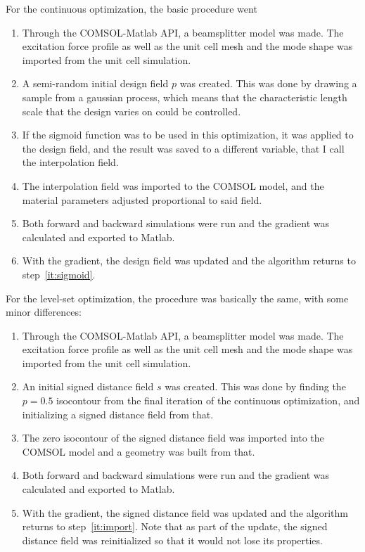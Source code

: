 For the continuous optimization, the basic procedure went
\begin{enumerate}
	\item Through the COMSOL-Matlab API, a beamsplitter model was made.
		The excitation force profile as well as the unit cell mesh and the mode
		shape was imported from the unit cell simulation.
	\item A semi-random initial design field $p$ was created. This was done by
		drawing a sample from a gaussian process, which means that the characteristic
		length scale that the design varies on could be controlled.
	\item\label{it:sigmoid} If the sigmoid function was to be used in this optimization, it was
		applied to the design field, and the result was saved to a different
		variable, that I call the interpolation field.
	\item The interpolation field was imported to the COMSOL model, and the
		material parameters adjusted proportional to said field.
	\item Both forward and backward simulations were run and the gradient was
		calculated and exported to Matlab.
	\item With the gradient, the design field was updated and the algorithm
		returns to step~\ref{it:sigmoid}.
\end{enumerate}

For the level-set optimization, the procedure was basically the same, with some
minor differences:
\begin{enumerate}
	\item Through the COMSOL-Matlab API, a beamsplitter model was made.
		The excitation force profile as well as the unit cell mesh and the mode
		shape was imported from the unit cell simulation.
	\item An initial signed distance field $s$ was created.
		This was done by finding the $p=0.5$ isocontour from the final iteration
		of the continuous optimization, and initializing a signed distance field
		from that.
	\item\label{it:import} The zero isocontour of the signed distance field was imported into
		the COMSOL model and a geometry was built from that.
	\item Both forward and backward simulations were run and the gradient was
		calculated and exported to Matlab.
	\item With the gradient, the signed distance field was updated and the algorithm
		returns to step~\ref{it:import}.
		Note that as part of the update, the signed distance field was
		reinitialized so that it would not lose its properties.
\end{enumerate}



